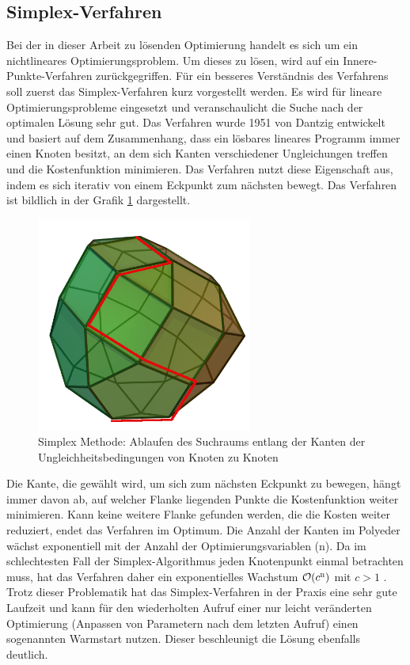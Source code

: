 \documentclass{like}
\begin{document}
\subsection{Simplex-Verfahren}
Bei der in dieser Arbeit zu lösenden Optimierung handelt es sich um ein nichtlineares Optimierungsproblem. Um dieses zu lösen, wird auf ein Innere-Punkte-Verfahren zurückgegriffen. Für ein besseres Verständnis des Verfahrens soll zuerst das Simplex-Verfahren kurz vorgestellt werden. Es wird für lineare Optimierungsprobleme eingesetzt und veranschaulicht die Suche nach der optimalen Lösung sehr gut. Das Verfahren wurde 1951 von Dantzig \cite{dantzig51} entwickelt und basiert auf dem Zusammenhang, dass ein lösbares lineares Programm immer einen Knoten besitzt, an dem sich Kanten verschiedener Ungleichungen treffen und die Kostenfunktion minimieren. Das Verfahren nutzt diese Eigenschaft aus, indem es sich iterativ von einem Eckpunkt zum nächsten bewegt. Das Verfahren ist bildlich in der Grafik \ref{fig:splxMethod} dargestellt.
\begin{figure}[ht!]
	\centering
	\includegraphics[width=200pt]{Abbildungen/simplexMethod.png}
	\caption{Simplex Methode: Ablaufen des Suchraums entlang der Kanten der Ungleichheitsbedingungen von Knoten zu Knoten}
	\label{fig:splxMethod}
\end{figure}

Die Kante, die gewählt wird, um sich zum nächsten Eckpunkt zu bewegen, hängt immer davon ab, auf welcher Flanke liegenden Punkte die Kostenfunktion weiter minimieren. Kann keine weitere Flanke gefunden werden, die die Kosten weiter reduziert, endet das Verfahren im Optimum. Die Anzahl der Kanten im Polyeder wächst exponentiell mit der Anzahl der Optimierungsvariablen (n). Da im schlechtesten Fall der Simplex-Algorithmus jeden Knotenpunkt einmal betrachten muss, hat das Verfahren daher ein exponentielles Wachstum $\mathcal{O}(c\textsuperscript{n})$ mit $c>1$ \cite{doi:10.1137/S0036144502414942}. Trotz dieser Problematik hat das Simplex-Verfahren in der Praxis eine sehr gute Laufzeit und kann für den wiederholten Aufruf einer nur leicht veränderten Optimierung (Anpassen von Parametern nach dem letzten Aufruf) einen sogenannten Warmstart nutzen. Dieser beschleunigt die Lösung ebenfalls deutlich.\\
\end{document}
